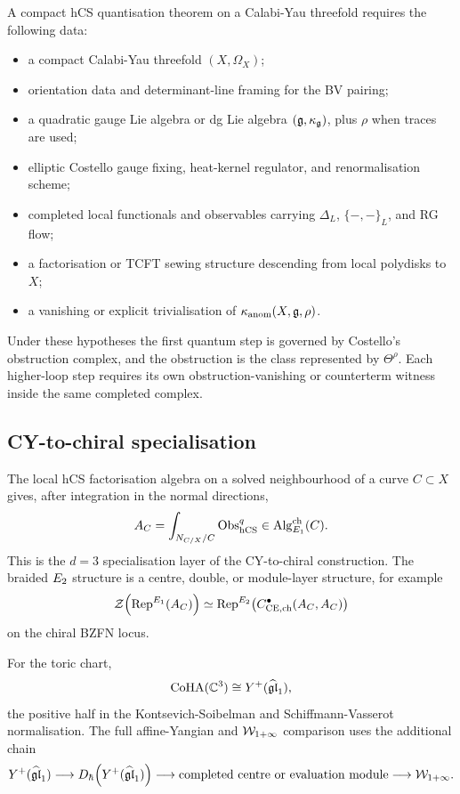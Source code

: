 A compact hCS quantisation theorem on a Calabi-Yau threefold requires
the following data:
\begin{itemize}
\item a compact Calabi-Yau threefold \((X,\Omega_X)\);
\item orientation data and determinant-line framing for the BV pairing;
\item a quadratic gauge Lie algebra or dg Lie algebra
  \((\mathfrak{g},\kappa_{\mathfrak{g}})\), plus \(\rho\) when traces are used;
\item elliptic Costello gauge fixing, heat-kernel regulator, and
  renormalisation scheme;
\item completed local functionals and observables carrying
  \(\Delta_L\), \(\{-,-\}_L\), and RG flow;
\item a factorisation or TCFT sewing structure descending from local
  polydisks to \(X\);
\item a vanishing or explicit trivialisation of
  \(\kappa_{\mathrm{anom}}(X,\mathfrak{g},\rho)\).
\end{itemize}
Under these hypotheses the first quantum step is governed by Costello's
obstruction complex, and the obstruction is the class represented by
\(\Theta^{\rho}\).  Each higher-loop step requires its own
obstruction-vanishing or counterterm witness inside the same completed
complex.

\subsection{CY-to-chiral specialisation}

The local hCS factorisation algebra on a solved neighbourhood of a
curve \(C\subset X\) gives, after integration in the normal directions,
\[
  A_C=
  \int_{N_{C/X}/C}\mathrm{Obs}^q_{\mathrm{hCS}}
  \in
  \operatorname{Alg}^{\mathrm{ch}}_{E_1}(C).
\]
This is the \(d=3\) specialisation layer of the CY-to-chiral
construction.  The braided \(E_2\) structure is a centre, double, or
module-layer structure, for example
\[
  \mathcal{Z}\!\left(\operatorname{Rep}^{E_1}(A_C)\right)
  \simeq
  \operatorname{Rep}^{E_2}\!\left(
    C^\bullet_{\mathrm{CE},\mathrm{ch}}(A_C,A_C)
  \right)
\]
on the chiral BZFN locus.

For the toric chart,
\[
  \mathrm{CoHA}(\mathbb{C}^3)\cong Y^{+}(\widehat{\mathfrak{gl}}_1),
\]
the positive half in the Kontsevich-Soibelman and
Schiffmann-Vasserot normalisation.  The full affine-Yangian and
\(\mathcal{W}_{1+\infty}\) comparison uses the additional chain
\[
  Y^{+}(\widehat{\mathfrak{gl}}_1)
  \longrightarrow
  D_{\hbar}\!\left(Y^{+}(\widehat{\mathfrak{gl}}_1)\right)
  \longrightarrow
  \text{completed centre or evaluation module}
  \longrightarrow
  \mathcal{W}_{1+\infty} .
\]

